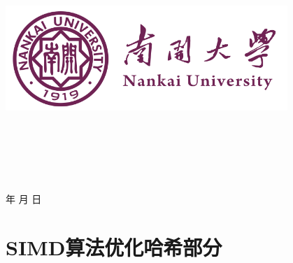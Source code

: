 \documentclass[a4paper]{article}
\newcommand{\HRule}{\rule{\linewidth}{0.5mm}}%
\begin{document}
\renewcommand{\contentsname}{目\ 录}
\renewcommand{\appendixname}{附录}
\renewcommand{\appendixpagename}{附录}
\renewcommand{\refname}{参考文献} 
\renewcommand{\figurename}{图}
\renewcommand{\tablename}{表}
\renewcommand{\today}{\number\year 年 \number\month 月 \number\day 日}

\begin{titlepage}
    \begin{center}
    \includegraphics[width=0.8\textwidth]{NKU.png}\\[1cm]
    \vspace{20mm}
		\textbf{\huge\textbf{}}\\[0.5cm]
		\textbf{\huge{}}\\[2.3cm]
		\textbf{\Huge\textbf{}}

		\vspace{\fill}
    
    \centering
    \textsc{\LARGE {}}\\[0.5cm]
    \textsc{\LARGE {}}\\[0.5cm]
    \textsc{\LARGE {}}\\[0.5cm]
    
    \vfill
    {\Large \today}
    \end{center}
\end{titlepage}

\renewcommand {\thefigure}{\thesection{}.\arabic{figure}}%
\renewcommand{\figurename}{图}
\renewcommand{\contentsname}{目录}  
\clearpage
\tableofcontents
\newpage
\clearpage
\section{SIMD算法优化哈希部分}
\end{document}
